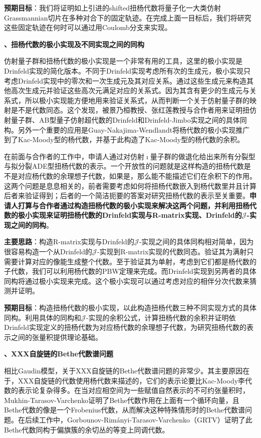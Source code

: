 \documentclass[12pt,UTF8,AutoFakeBold=4,a4paper]{ctexart}
\begin{document}
\textbf{预期目标}：我们将证明如上引进的shifted扭杨代数将量子化一大类仿射Grassmannian切片在多种对合下的固定轨迹。在完成上面一目标后，我们将研究这些固定轨迹在何时可以通过用Coulomb分支来实现。

\medskip

\textbf{、扭杨代数的极小实现及不同实现之间的同构}

仿射量子群和扭杨代数的极小实现是一个非常有用的工具，这里的极小实现是Drinfeld实现的简化版本。不同于Drinfeld实现考虑所有次的生成元，极小实现只考虑Drinfeld实现中的零次和一次生成元及其对应关系。通过这些生成元来构造其他高次生成元并验证这些高次元满足对应的关系式。因为其含有更少的生成元与关系式，所以极小实现能方便地用来验证关系式，从而判断一个关于仿射量子群的映射是不是代数同态。这个发现，被景乃桓教授、张红莲教授与合作者用来证明扭仿射量子群、AB型量子仿射超代数的Drinfeld和Drinfeld-Jimbo实现之间的具体同构。另外一个重要的应用是Guay-Nakajima-Wendlandt将杨代数的极小实现推广到了Kac-Moody型的杨代数，并基于此构造了Kac-Moody型的杨代数的余积。

在前面与合作者的工作中，申请人通过对仿射$\imath$量子群的做退化给出来所有分裂型与拟分裂ADE型扭杨代数的表示。一个开放性的问题就是这样构造的扭杨代数是不是对应杨代数的余理想子代数，如果是，那么能不能描述它们在余积下的作用。这两个问题是息息相关的，前者需要考虑如何将扭杨代数嵌入到杨代数里并且计算后者来验证得到；后者的一个简洁扼要的答案对研究扭杨代数的表示至关重要。\textbf{申请人打算与合作者通过构造扭杨代数的极小实现来解决这两个问题，并利用扭杨代数的极小实现来证明扭杨代数的Drinfeld实现与R-matrix实现、Drinfeld的$\mathcal J$-实现之间的同构}。

\textbf{主要思路}：构造R-matrix实现与Drinfeld的$\mathcal J$-实现之间的具体同构相对简单，因为很容易构造一个从Drinfeld的$\mathcal J$-实现到R-matrix实现的代数同态。验证其为满射只需要计算对应的像能生成整个代数。至于验证其为单射，考虑到它们都是杨代数的子代数，我们可以利用杨代数的PBW定理来完成。而Drinfeld实现到另两者的具体同构将通过极小实现来完成。这个极小实现可以通过考虑对应的相伴分次代数来猜测并证明。

\textbf{预期目标}：构造扭杨代数的极小实现，以此构造扭杨代数三种不同实现方式的具体同构。利用具体的同构和$\mathcal J$-实现的余积公式，计算扭杨代数的余积并证明依Drinfeld实现定义的扭杨代数为对应杨代数的余理想子代数，为研究扭杨代数的表示之间的张量积提供理论基础。

\medskip



\textbf{、XXX自旋链的Bethe代数谱问题}

相比Gaudin模型，关于XXX自旋链的Bethe代数谱问题的非常少。其主要原因在于，XXX自旋链的代数使用杨代数来描述的，它们的表示论要比Kac-Moody李代数的表示论复杂得多。在当对应相空间为一些赋值自然表示的不可约张量积时，Mukhin-Tarasov-Varchenko证明了Bethe代数作用在上面有一个循环向量，且Bethe代数的像是一个Frobenius代数，从而解决这种特殊情形时的Bethe代数谱问题。在后续工作中，Gorbounov-Rimányi-Tarasov-Varchenko（GRTV）证明了此Bethe代数同构于偏旗簇的余切丛的等变上同调代数。
\end{document}
